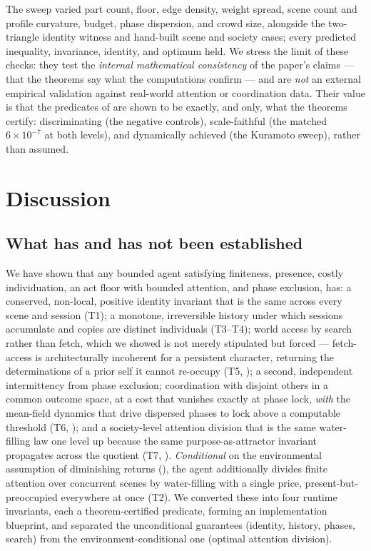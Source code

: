 \documentclass[11pt,twocolumn,a4paper]{article}
\begin{document}
The sweep varied part count, floor, edge density, weight spread, scene count
and profile curvature, budget, phase dispersion, and crowd size, alongside
the two-triangle identity witness and hand-built scene and society cases;
every predicted inequality, invariance, identity, and optimum held. We
stress the limit of these checks: they test the \emph{internal mathematical
consistency} of the paper's claims --- that the theorems say what the
computations confirm --- and are \emph{not} an external empirical validation
against real-world attention or coordination data. Their value is that the
predicates of  are shown to be exactly, and only, what
the theorems certify: discriminating (the negative controls), scale-faithful
(the matched $6\times10^{-7}$ at both levels), and dynamically achieved (the
Kuramoto sweep), rather than assumed.

\section{Discussion}
\label{sec:discussion}

\subsection{What has and has not been established}

We have shown that any bounded agent satisfying finiteness, presence,
costly individuation, an act floor with bounded attention, and phase
exclusion, has: a conserved, non-local, positive identity invariant that
is the same across every scene and session (T1); a monotone,
irreversible history under which sessions accumulate and copies are
distinct individuals (T3--T4); world access by search rather than fetch,
which we showed is not merely stipulated but forced --- fetch-access is
architecturally incoherent for a persistent character, returning the
determinations of a prior self it cannot re-occupy (T5,
); a second, independent intermittency from
phase exclusion; coordination with disjoint others in a common outcome
space, at a cost that vanishes exactly at phase lock, \emph{with} the
mean-field dynamics that drive dispersed phases to lock above a computable
threshold (T6, ); and a society-level attention
division that is the same water-filling law one level up because the same
purpose-as-attractor invariant propagates across the quotient (T7,
). \emph{Conditional} on the
environmental assumption of diminishing returns (), the
agent additionally divides finite attention over concurrent scenes by
water-filling with a single price, present-but-preoccupied everywhere at
once (T2). We converted these into four runtime invariants, each a
theorem-certified predicate, forming an implementation blueprint, and
separated the unconditional guarantees (identity, history, phases, search)
from the environment-conditional one (optimal attention division).
\end{document}
